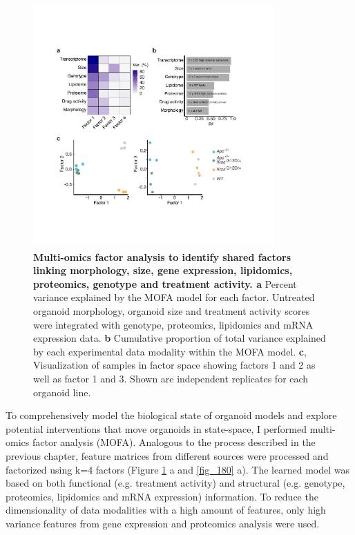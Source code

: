 \begin{flushleft}
\begin{figure}[h!]
\centering
\includegraphics[width=350,
                height=\textheight,
                keepaspectratio]{figures/adenomaprofiling/pdf/fig_1_7.pdf}
\caption{\textbf{Multi-omics factor analysis to identify shared factors linking morphology, size, gene expression, lipidomics, proteomics, genotype and treatment activity. a} Percent variance explained by the MOFA model for each factor. Untreated organoid morphology, organoid size and treatment activity scores were integrated with genotype, proteomics, lipidomics and mRNA expression data. \textbf{b} Cumulative proportion of total variance explained by each experimental data modality within the MOFA model. \textbf{c}, Visualization of samples in factor space showing factors 1 and 2 as well as factor 1 and 3. Shown are independent replicates for each organoid line. 
}
\label{fig_170}
\end{figure}
\bigbreak

To comprehensively model the biological state of organoid models and explore potential interventions that move organoids in state-space, I performed multi-omics factor analysis (MOFA). Analogous to the process described in the previous chapter, feature matrices from different sources were processed and factorized using k=4 factors (Figure \ref{fig_170} a and \ref{fig_180} a). The learned model was based on both functional (e.g. treatment activity) and structural (e.g. genotype, proteomics, lipidomics and mRNA expression) information. To reduce the dimensionality of data modalities with a high amount of features, only high variance features from gene expression and proteomics analysis were used.


\end{flushleft}
